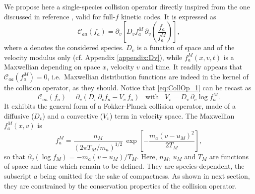 \documentclass[11pt]{article}
\begin{document}
We propose here a single-species collision operator directly inspired from the one discussed in reference \cite{DifPradalier2011}, valid for full-$f$ kinetic codes. It is expressed as
%
\begin{equation} \label{eq:CollOp_1}
\mathcal{C}_{aa}(f_a) = \partial_{v} \left[ D_v f_{a}^{M} \, \partial_{v}
\left( \frac{f_a}{f_{a}^M} \right)\right],
\end{equation}
%
where $a$ denotes the considered species. $D_v$ is a function of space and of the velocity modulus only (cf. Appendix \ref{appendix:Dv}), while $f_a^{M}(x,v,t)$ is a Maxwellian depending on space $x$, velocity $v$ and time. It readily appears that $\mathcal{C}_{aa}(f_a^{M})=0$, i.e.\ Maxwellian distribution functions are indeed in the kernel of the collision operator, as they should.
Notice that \cref{eq:CollOp_1} can be recast as
%
\begin{equation} \label{eq:CollOp_FP}
\mathcal{C}_{aa}(f_a) = \partial_{v} \left( 
D_v\, \partial_{v}f_{a} - V_v\,  f_a\right)
\;\;\; \textrm{with} \;\;\;
V_v = D_v\, \partial_{v} \operatorname{log} f^M_{a} .
\end{equation}
%
It exhibits the general form of a Fokker-Planck collision operator, made of a diffusive ($D_v$) and a convective ($V_v$) term in velocity space.
The Maxwellian $f_a^{M}(x,v)$ is
%
\begin{equation} \label{eq:f_M}
f_a^{M} = \frac{n_{M}}{(2\pi T_{M}/m_a)^{1/2}}\, \exp\left[ -\frac{m_a(v-u_{M})^2}{2T_{M}}\right],
\end{equation}
%
so that $\partial_v(\log f_{M}) = -m_a(v-u_{M})/T_{M}$. Here, $n_{M}$, $u_{M}$ and $T_{M}$ are functions of space and time which remain to be defined. They are species-dependent, the subscript $a$ being omitted for the sake of compactness. As shown in next section, they are constrained by the conservation properties of the collision operator.


\end{document}
